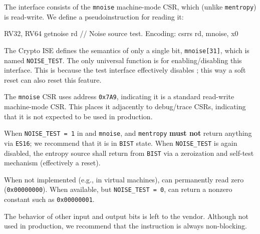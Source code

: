     The interface consists of the {\tt mnoise} machine-mode CSR, which
    (unlike {\tt mentropy}) is read-write. We define a
    pseudoinstruction for reading it:
\begin{cryptoisa}
RV32, RV64
    getnoise    rd   // Noise source test. Encoding: csrrs rd, mnoise, x0
\end{cryptoisa}

    The Crypto ISE defines the semantics of only a single bit,
    \verb|mnoise[31]|, which is named \verb|NOISE_TEST|. The only
    universal function is for enabling/disabling this interface. This is
    because the test interface effectively disables ;
    this way a soft reset can also reset this feature.

    The {\tt mnoise} CSR uses address {\tt 0x7A9}, indicating it is a
    standard read-write machine-mode CSR.
    This places it adjacently to debug/trace CSRs, indicating that
    it is not expected to be used in production.

    When \verb|NOISE_TEST = 1| in  and {\tt mnoise},
     and {\tt mentropy} {\bf must not} return
    anything via \verb|ES16|; we recommend
    that it is in \verb|BIST| state. When \verb|NOISE_TEST| is
    again disabled, the entropy source shall return from \verb|BIST|
    via a zeroization and self-test mechanism (effectively a reset).

    When not implemented (e.g., in virtual machines), 
    can permanently read zero (\verb|0x00000000|). When available, but
    \verb|NOISE_TEST = 0|,  can return a nonzero
    constant such as \verb|0x00000001|.

    The behavior of other input and output bits is left to the vendor.
    Although not used in production, we recommend that the instruction
    is always non-blocking.

